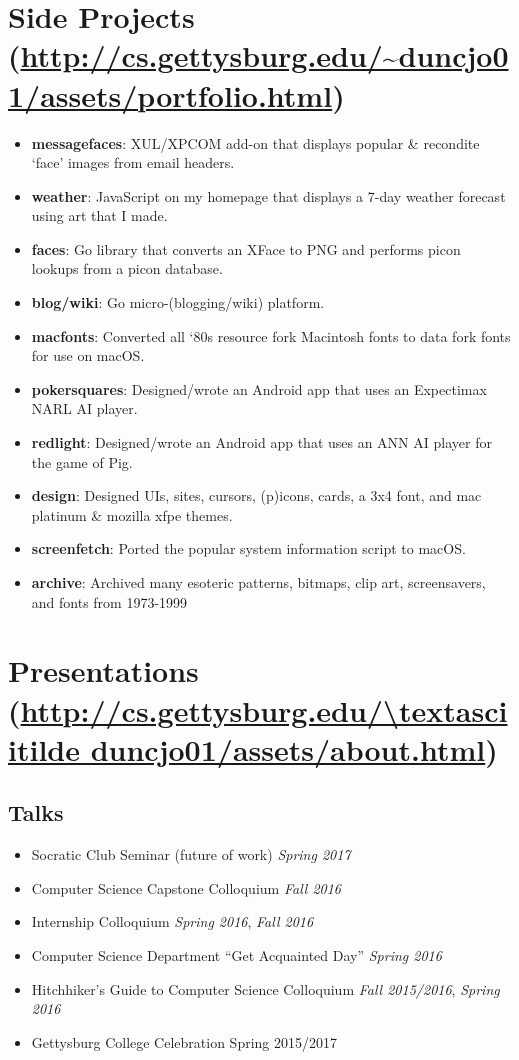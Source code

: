 \documentclass[11pt]{article}
\begin{document}
\section*{Side Projects (\url{http://cs.gettysburg.edu/~duncjo01/assets/portfolio.html})}
\begin{itemize}[noitemsep]
	\item \textbf{messagefaces}: XUL/XPCOM add-on that displays popular \& recondite `face' images from email headers.
	\item \textbf{weather}: JavaScript on my homepage that displays a 7-day weather forecast using art that I made.
	\item \textbf{faces}: Go library that converts an XFace to PNG and performs picon lookups from a picon database.
	\item \textbf{blog/wiki}: Go micro-(blogging/wiki) platform.
	\item \textbf{macfonts}: Converted all `80s resource fork Macintosh fonts to data fork fonts for use on macOS. 
	\item \textbf{pokersquares}: Designed/wrote an Android app that uses an Expectimax NARL AI player. 
	\item \textbf{redlight}: Designed/wrote an Android app that uses an ANN AI player for the game of Pig.
	\item \textbf{design}: Designed UIs, sites, cursors, (p)icons, cards, a 3x4 font, and mac platinum \& mozilla xfpe themes.
	\item \textbf{screenfetch}: Ported the popular system information script to macOS.
	\item \textbf{archive}: Archived many esoteric patterns, bitmaps, clip art, screensavers, and fonts from 1973-1999
\end{itemize}

\section*{Presentations (\url{http://cs.gettysburg.edu/\textasciitilde duncjo01/assets/about.html})}
\subsection*{Talks}
\begin{itemize}[noitemsep]
	\item Socratic Club Seminar (future of work) \hfill \textit{Spring 2017}
	\item Computer Science Capstone Colloquium \hfill \textit{Fall 2016}
	\item Internship Colloquium \hfill \textit{Spring 2016}, \textit{Fall 2016}
	\item Computer Science Department ``Get Acquainted Day'' \hfill \textit{Spring 2016}
	\item Hitchhiker's Guide to Computer Science Colloquium \hfill \textit{Fall 2015/2016}, \textit{Spring 2016}
	\item Gettysburg College Celebration \hfill Spring 2015/2017
\end{itemize}
\end{document}

